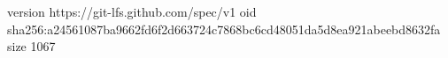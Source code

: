 version https://git-lfs.github.com/spec/v1
oid sha256:a24561087ba9662fd6f2d663724c7868bc6cd48051da5d8ea921abeebd8632fa
size 1067
